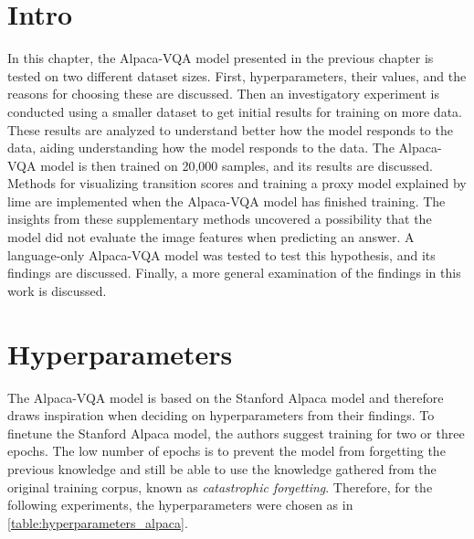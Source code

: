 \label{4_investigatory_experiments}

\section{Intro}

In this chapter, the Alpaca-VQA model presented in the previous chapter is tested on two different dataset sizes. First, hyperparameters, their values, and the reasons for choosing these are discussed. Then an investigatory experiment is conducted using a smaller dataset to get initial results for training on more data. 
These results are analyzed to understand better how the model responds to the data, aiding understanding how the model responds to the data.
The Alpaca-VQA model is then trained on 20,000 samples, and its results are discussed. Methods for visualizing transition scores and training a proxy model explained by \gls{lime} are implemented when the Alpaca-VQA model has finished training. 
The insights from these supplementary methods uncovered a possibility that the model did not evaluate the image features when predicting an answer. A language-only Alpaca-VQA model was tested to test this hypothesis, and its findings are discussed. 
Finally, a more general examination of the findings in this work is discussed. 

\section{Hyperparameters}
    The Alpaca-VQA model is based on the Stanford Alpaca model and therefore draws inspiration when deciding on hyperparameters from their findings.
    To finetune the Stanford Alpaca model, the authors suggest training for two or three epochs. The low number of epochs is to prevent the model from forgetting the previous knowledge and still be able to use the knowledge gathered from the original training corpus, known as \textit{catastrophic forgetting}. Therefore, for the following experiments, the hyperparameters were chosen as in \autoref{table:hyperparameters_alpaca}. 
    
